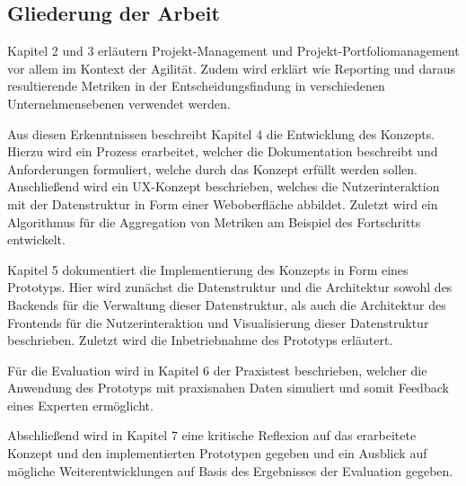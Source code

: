 \subsection{Gliederung der Arbeit}
Kapitel 2 und 3 erläutern Projekt-Management und Projekt-Portfoliomanagement vor allem im Kontext der Agilität. Zudem wird erklärt wie Reporting und daraus resultierende Metriken in der Entscheidungsfindung in verschiedenen Unternehmensebenen verwendet werden.

Aus diesen Erkenntnissen beschreibt Kapitel 4 die Entwicklung des Konzepts. Hierzu wird ein Prozess erarbeitet, welcher die Dokumentation beschreibt und Anforderungen formuliert, welche durch das Konzept erfüllt werden sollen. Anschließend wird ein UX-Konzept beschrieben, welches die Nutzerinteraktion mit der Datenstruktur in Form einer Weboberfläche abbildet. Zuletzt wird ein Algorithmus für die Aggregation von Metriken am Beispiel des Fortschritts entwickelt.

Kapitel 5 dokumentiert die Implementierung des Konzepts in Form eines Prototyps. Hier wird zunächst die Datenstruktur und die Architektur sowohl des Backends für die Verwaltung dieser Datenstruktur, als auch die Architektur des Frontends für die Nutzerinteraktion und Visualisierung dieser Datenstruktur beschrieben.
Zuletzt wird die Inbetriebnahme des Prototyps erläutert.

Für die Evaluation wird in Kapitel 6 der Praxistest beschrieben, welcher die Anwendung des Prototyps mit praxisnahen Daten simuliert und somit Feedback eines Experten ermöglicht.

Abschließend wird in Kapitel 7 eine kritische Reflexion auf das erarbeitete Konzept und den implementierten Prototypen gegeben und ein Ausblick auf mögliche Weiterentwicklungen auf Basis des Ergebnisses der Evaluation gegeben.
